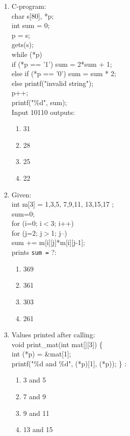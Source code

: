 \documentclass[journal,cmex10]{IEEEtran}
\theoremstyle{remark}
\numberwithin{equation}{enumi}
\numberwithin{figure}{enumi}
\begin{document}
\begin{enumerate}[label=\arabic*)]
    \item C-program:\\

char s[80], *p;\\
int sum = 0;\\
p = s;\\
gets(s);\\
while (*p) {\\
  if (*p == '1') sum = 2*sum + 1;\\
  else if (*p == '0') sum = sum * 2;\\
  else printf("invalid string");\\
  p++;\\
}
printf("\%d", sum);\\

    Input 10110 outputs:
    \bigskip
    \hfill {}
    \begin{enumerate}[label=\alph*)]
        \item 31
        \item 28
        \item 25
        \item 22
    \end{enumerate}
    \bigskip

    \item Given:\\

int m[3] = { {1,3,5}, {7,9,11}, {13,15,17} };\\
sum=0;\\
for (i=0; i$<$3; i++)\\
  for (j=2; j$>$1; j--)\\
    sum += m[i][j]*m[i][j-1];\\
    prints \texttt{sum =} ?:
    \bigskip
    \hfill {}
    \begin{enumerate}[label=\alph*)]
        \item 369
        \item 361
        \item 303
        \item 261
    \end{enumerate}
    \bigskip

    \item Values printed after calling:\\

void print\_mat(int mat[][3]) \{\\
  int (*p) = \&mat[1];\\
  printf("\%d and \%d", (*p)[1], (*p));
\} :
    \bigskip
    \hfill {}
    \begin{enumerate}[label=\alph*)]
        \item 3 and 5
        \item 7 and 9
        \item 9 and 11
        \item 13 and 15
    \end{enumerate}
    \bigskip


\end{enumerate}
\end{document}
